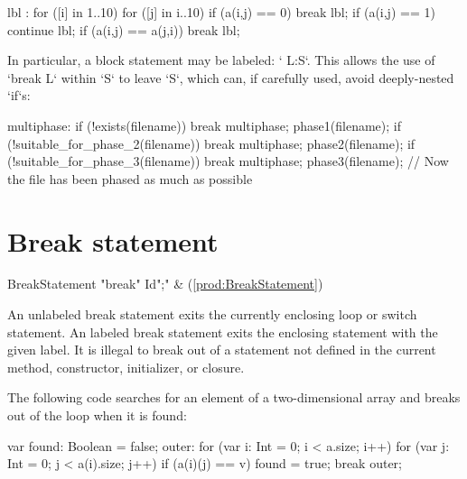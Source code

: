 \begin{xten}
lbl : for ([i] in 1..10) {
   for ([j] in i..10) {  
      if (a(i,j) == 0) break lbl;
      if (a(i,j) == 1) continue lbl;
      if (a(i,j) == a(j,i)) break lbl;
   }
}
\end{xten}

In particular, a block statement may be labeled: \xcd` L:{S}`.  This allows
the use of \xcd`break L` within \xcd`S` to leave \xcd`S`, which can, if
carefully used, avoid deeply-nested \xcd`if`s: 

\begin{xten}
multiphase: {
  if (!exists(filename)) break multiphase;
  phase1(filename);
  if (!suitable_for_phase_2(filename)) break multiphase;
  phase2(filename);
  if (!suitable_for_phase_3(filename)) break multiphase;
  phase3(filename);
}
// Now the file has been phased as much as possible
\end{xten}



\section{Break statement}

\begin{bbgrammar}
 BreakStatement    \: \xcd"break" Id\opt \xcd";" & (\ref{prod:BreakStatement})\\%
\end{bbgrammar}


An unlabeled break statement exits the currently enclosing loop or switch
statement. An labeled break statement exits the enclosing 
statement with the given label.
It is illegal to break out of a statement not defined in the current
method, constructor, initializer, or closure.  

The following code searches for an element of a two-dimensional
array and breaks out of the loop when it is found:

\begin{xten}
var found: Boolean = false;
outer: for (var i: Int = 0; i < a.size; i++)
    for (var j: Int = 0; j < a(i).size; j++)
        if (a(i)(j) == v) {
            found = true;
            break outer;
        }
\end{xten}

